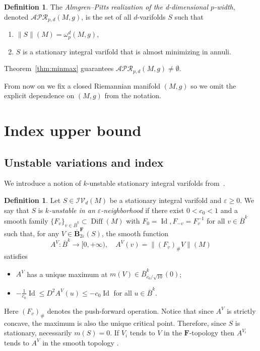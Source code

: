 \documentclass[12pt,english]{article}
\theoremstyle{definition}
\newtheorem{definition}[theorem]{Definition}
\begin{document}
\begin{definition}
The \textit{Almgren--Pitts realization of the d-dimensional \(p\)-width}, denoted \(\mathcal{APR}_{p,d}(M,g)\), is the set of all \(d\)-varifolds \(S\) such that
\begin{enumerate}
    \item \(\|S\|(M)=\omega_p^d(M,g)\),
    \item \(S\) is a stationary integral varifold that is almost minimizing in annuli.
\end{enumerate}
Theorem~\ref{thm:minmax} guarantees \(\mathcal{APR}_{p,d}(M,g)\neq\emptyset\).
\end{definition}

From now on we fix a closed Riemannian manifold $(M,g)$ so we omit the explicit dependence on $(M,g)$ from the notation.

\section{Index upper bound}
\subsection{Unstable variations and index}\label{subsec-unstable}

We introduce a notion of $k$-unstable stationary integral varifolds from~\cite{MarquesNeves}.

\begin{definition}
    Let $S \in \mathcal{IV}_d(M)$ be a stationary integral varifold and $\varepsilon \geq 0$. We say that $S$ is \textit{$k$-unstable in an $\varepsilon$-neighborhood} if there exist $0 < c_0 < 1$ and a smooth family $\{F_v\}_{v \in \overline{B}^k} \subset \operatorname{Diff}(M)$ with $F_0 = \operatorname{Id}, F_{-v} = F^{-1}_v$ for all $v \in \overline{B}^k$ such that, for any $V \in \overline{\textbf{B}}^{\mathbf{F}}_{2\varepsilon}(S)$, the smooth function
    \begin{equation*}
        A^V: \overline{B}^k \rightarrow [0, +\infty), \quad A^V(v) = \lVert (F_v)_\# V \rVert (M)
    \end{equation*}
    satisfies
    \begin{itemize}
        \item $A^V$ has a unique maximum at $m(V) \in \overline{B}^k_{c_0/\sqrt{10}}(0)$;
        \item $-\frac{1}{c_0} \operatorname{Id} \leq D^2 A^V(u) \leq -c_0 \operatorname{Id}$ for all $u \in \overline{B}^k$.
    \end{itemize}
\end{definition}
Here $(F_v)_\#$ denotes the push-forward operation. Notice that since $A^V$ is strictly concave, the maximum is also the unique critical point. Therefore, since $S$ is stationary, necessarily $m(S)=0$. If $V_i$ tends to $V$ in the $\mathbf{F}$-topology then $A^{V_i}$ tends to $A^V$ in the smooth topology \cite[Section~2.3(2)]{Pi2}.
\end{document}

